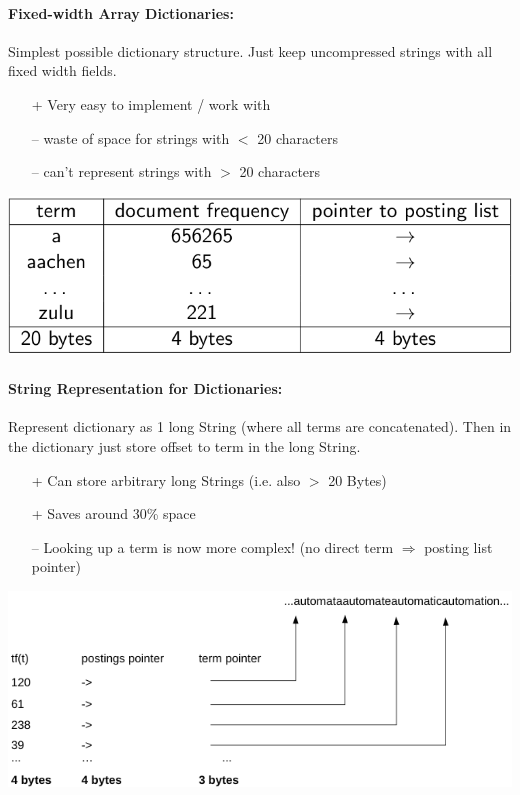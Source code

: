 \documentclass[a4paper,11pt]{article}
\begin{document}
\begin{multicols}{2}
\paragraph{Fixed-width Array Dictionaries:} Simplest possible dictionary structure. Just keep uncompressed strings with all fixed width fields.
\begin{itemize}
  \item[+] Very easy to implement / work with
  \item[--] waste of space for strings with $<$ 20 characters
  \item[--] can't represent strings with $>$ 20 characters
\end{itemize}
\begin{center}
  \includegraphics[width=0.6\columnwidth]{dictionary-fixed-width.png}
\end{center}

\paragraph{String Representation for Dictionaries:} Represent dictionary as 1 long String (where all terms are concatenated). Then in the dictionary just store offset to term in the long String. 
\begin{itemize}
  \item[+] Can store arbitrary long Strings (i.e. also $>$ 20 Bytes) 
  \item[+] Saves around 30\% space
  \item[--] Looking up a term is now more complex! (no direct term $\Rightarrow$ posting list pointer)
\end{itemize}
\vspace{-0.5cm}
\begin{center}
  \includegraphics[width=0.7\columnwidth]{dictionary-string-representation.png}
\end{center}


\end{multicols}
\end{document}
